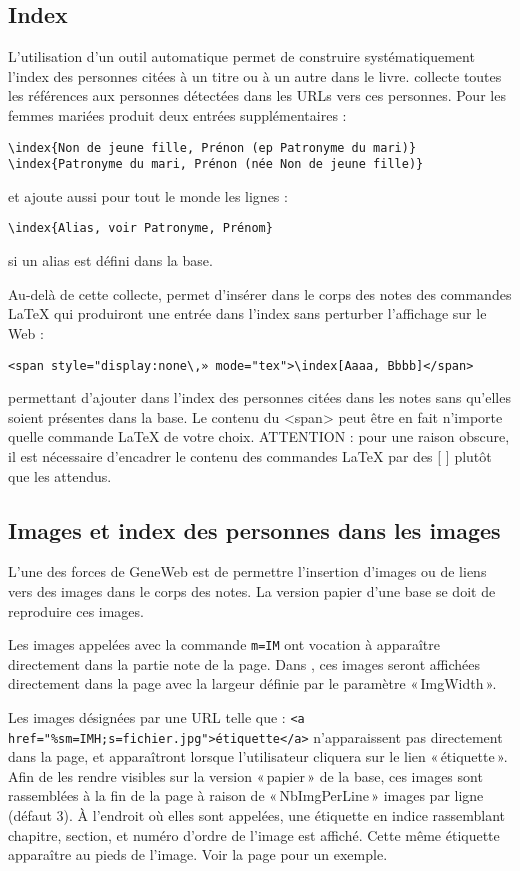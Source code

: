\subsection{Index}

L'utilisation d'un outil automatique permet de construire systématiquement
l'index des personnes citées à un titre ou à un autre dans le livre.
\gwtol{} collecte toutes les références aux personnes
détectées dans les URLs vers ces personnes. Pour les femmes mariées
\gwtol{} produit deux entrées supplémentaires :
\begin{verbatim}
\index{Non de jeune fille, Prénon (ep Patronyme du mari)}
\index{Patronyme du mari, Prénon (née Non de jeune fille)}
\end{verbatim}
et ajoute aussi pour tout le monde les lignes :
\begin{verbatim}
\index{Alias, voir Patronyme, Prénom}
\end{verbatim}
si un alias est défini dans la base.

Au-delà de cette collecte, \gwtol{} permet d'insérer dans le corps des notes
des commandes \LaTeX{} qui produiront une entrée dans l'index sans perturber
l'affichage sur le Web :
\begin{verbatim}
<span style="display:none\,» mode="tex">\index[Aaaa, Bbbb]</span>
\end{verbatim}
permettant d'ajouter dans l'index des personnes citées dans les notes
sans qu'elles soient présentes dans la base.
Le contenu du <span> peut être en fait n'importe quelle commande LaTeX de votre choix.
ATTENTION : pour une raison obscure, il est nécessaire d'encadrer le
contenu des commandes \LaTeX{} par des [ ] plutôt que les { } attendus.

\subsection{Images et index des personnes dans les images}

L'une des forces de GeneWeb est de permettre l'insertion d'images ou de
liens vers des images dans le corps des notes. La version papier d'une base
se doit de reproduire ces images.

Les images appelées avec la commande \verb|m=IM| ont vocation à apparaître
directement dans la partie note de la page. Dans \gwtol{}, ces images seront
affichées directement dans la page avec la largeur définie par
le paramètre «\,ImgWidth\,».

Les images désignées par une URL telle que :
\verb|<a href="%sm=IMH;s=fichier.jpg">étiquette</a>| n'apparaissent pas
directement dans la page, et apparaîtront lorsque l'utilisateur cliquera
sur le lien «\,étiquette\,». Afin de les rendre visibles sur la
version «\,papier\,» de la base, ces images sont rassemblées à la fin
de la page à raison de «\,NbImgPerLine\,» images par ligne (défaut 3).
À l'endroit où elles sont appelées, une étiquette en indice rassemblant
chapitre, section, et numéro d'ordre de l'image est affiché. Cette même 
étiquette apparaître au pieds de l'image.
Voir la page \pageref{leondupont} pour un exemple.

